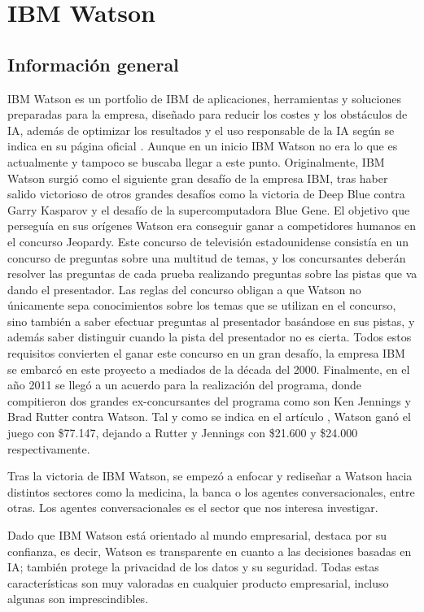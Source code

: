 \section{IBM Watson}

\subsection*{Información general}

IBM Watson es un \gls{portfolio} de IBM de aplicaciones, herramientas y soluciones preparadas para la empresa, diseñado para reducir los costes y los obstáculos de \gls{IA}, además de optimizar los resultados y el uso responsable de la \gls{IA} según se indica en su página oficial \cite{RefWorks:RefID:15-2021ibm}. Aunque en un inicio IBM Watson no era lo que es actualmente y tampoco se buscaba llegar a este punto. Originalmente, IBM Watson surgió como el siguiente gran desafío de la empresa IBM, tras haber salido victorioso de otros grandes desafíos como la victoria de Deep Blue contra Garry Kasparov y el desafío de la supercomputadora Blue Gene. El objetivo que perseguía en sus orígenes Watson era conseguir ganar a competidores humanos en el concurso Jeopardy. Este concurso de televisión estadounidense consistía en un concurso de preguntas sobre una multitud de temas, y los concursantes deberán resolver las preguntas de cada prueba realizando preguntas sobre las pistas que va dando el presentador. Las reglas del concurso obligan a que Watson no únicamente sepa conocimientos sobre los temas que se utilizan en el concurso, sino también a saber efectuar preguntas al presentador basándose en sus pistas, y además saber distinguir cuando la pista del presentador no es cierta. Todos estos requisitos convierten el ganar este concurso en un gran desafío, la empresa IBM se embarcó en este proyecto a mediados de la década del 2000. Finalmente, en el año 2011 se llegó a un acuerdo para la realización del programa, donde compitieron dos grandes ex-concursantes del programa como son Ken Jennings y Brad Rutter contra Watson. Tal y como se indica en el artículo \cite{RefWorks:RefID:16-best2013ibm}, Watson ganó el juego con \$77.147, dejando a Rutter y Jennings con \$21.600 y \$24.000 respectivamente.

Tras la victoria de IBM Watson, se empezó a enfocar y rediseñar a Watson hacia distintos sectores como la medicina, la banca o los agentes conversacionales, entre otras. Los agentes conversacionales es el sector que nos interesa investigar.

Dado que IBM Watson está orientado al mundo empresarial, destaca por su confianza, es decir, Watson es transparente en cuanto a las decisiones basadas en \gls{IA}; también protege la privacidad de los datos y su seguridad. Todas estas características son muy valoradas en cualquier producto empresarial, incluso algunas son imprescindibles.

